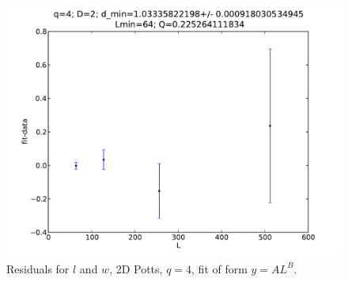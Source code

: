 \documentclass[pre,preprint,11pt]{revtex4}
\begin{document}
\begin{figure}[htp]
\centering
\includegraphics[width=.55\textwidth]{figures/q4D2Lmin64fitplot}
\caption{Residuals for $l$ and $w$, 2D Potts, $q=4$, fit of form $y=AL^B$.}
\end{figure}





































\end{document}
